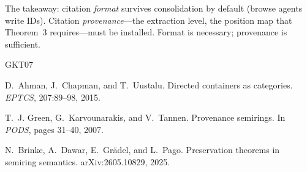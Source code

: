 \documentclass[11pt,a4paper]{article}
\theoremstyle{plain}
\theoremstyle{definition}
\begin{document}
The takeaway: citation \emph{format} survives consolidation by default
(browse agents write IDs). Citation \emph{provenance}---the extraction
level, the position map that Theorem~3 requires---must be installed.
Format is necessary; provenance is sufficient.


\begin{thebibliography}{GKT07}

D.~Ahman, J.~Chapman, and T.~Uustalu.
\newblock Directed containers as categories.
\newblock \emph{EPTCS}, 207:89--98, 2015.

T.~J. Green, G.~Karvounarakis, and V.~Tannen.
\newblock Provenance semirings.
\newblock In \emph{PODS}, pages 31--40, 2007.

N.~Brinke, A.~Dawar, E.~Gr\"adel, and L.~Pago.
\newblock Preservation theorems in semiring semantics.
\newblock arXiv:2605.10829, 2025.

\end{thebibliography}
\end{document}
